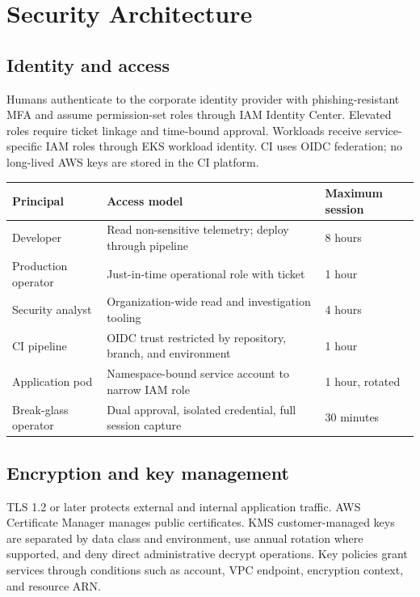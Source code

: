 \section{Security Architecture}

\subsection{Identity and access}

Humans authenticate to the corporate identity provider with phishing-resistant MFA and assume permission-set roles through IAM Identity Center. Elevated roles require ticket linkage and time-bound approval. Workloads receive service-specific IAM roles through EKS workload identity. CI uses OIDC federation; no long-lived AWS keys are stored in the CI platform.

\begin{tabularx}{\textwidth}{@{}L{31mm}Y L{33mm}@{}}
  \toprule
  \color{white}\textbf{Principal} & \color{white}\textbf{Access model} & \color{white}\textbf{Maximum session} \\
  \midrule
  Developer & Read non-sensitive telemetry; deploy through pipeline & 8 hours \\
  Production operator & Just-in-time operational role with ticket & 1 hour \\
  Security analyst & Organization-wide read and investigation tooling & 4 hours \\
  CI pipeline & OIDC trust restricted by repository, branch, and environment & 1 hour \\
  Application pod & Namespace-bound service account to narrow IAM role & 1 hour, rotated \\
  Break-glass operator & Dual approval, isolated credential, full session capture & 30 minutes \\
  \bottomrule
\end{tabularx}

\subsection{Encryption and key management}

TLS 1.2 or later protects external and internal application traffic. AWS Certificate Manager manages public certificates. KMS customer-managed keys are separated by data class and environment, use annual rotation where supported, and deny direct administrative decrypt operations. Key policies grant services through conditions such as account, VPC endpoint, encryption context, and resource ARN.

